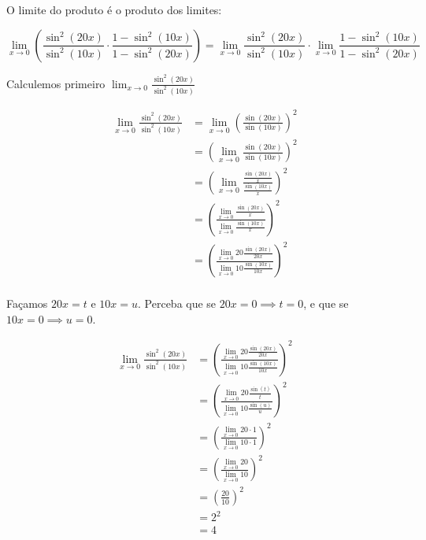 \documentclass{article}
\begin{document}
O limite do produto é o produto dos limites:

\begin{equation} \label{question_3_product_limit}
    \lim_{x \to 0} \left(\frac{ \sin^2 (20x)}{\sin^2 (10x)} \cdot \frac{1 - \sin^2 (10x)}{1 - \sin^2 (20x)}\right)
    = \lim_{x \to 0} \frac{ \sin^2 (20x)}{\sin^2 (10x)}  \cdot \lim_{x \to 0}  \frac{1 - \sin^2 (10x)}{1 - \sin^2 (20x)}
\end{equation}

Calculemos primeiro \(\lim_{x \to 0} \frac{ \sin^2 (20x)}{\sin^2 (10x)}\)

\begin{align*}
    \lim_{x \to 0} \frac{ \sin^2 (20x)}{\sin^2 (10x)}
     & = \lim_{x \to 0} \left( \frac{ \sin (20x)}{\sin (10x)} \right)^2                                            \\
     & =  \left( \lim_{x \to 0} \frac{ \sin (20x)}{\sin (10x)} \right)^2                                           \\
     & = \left(\lim_{x \to 0} \frac{ \frac{\sin (20x)}{x}}{\frac{\sin (10x)}{x}}\right)^2                          \\
     & = \left( \frac{\lim_{x \to 0} \frac{\sin (20x)}{x}}{\lim_{x \to 0} \frac{\sin (10x)}{x}}\right)^2           \\
     & = \left( \frac{\lim_{x \to 0} 20 \frac{\sin (20x)}{20x}}{\lim_{x \to 0} 10 \frac{\sin (10x)}{10x}}\right)^2 \\
\end{align*}

Façamos \(20x = t\) e \(10x = u\). Perceba que se \(20x = 0 \implies t = 0 \),
e que se \(10x = 0 \implies u = 0 \).

\begin{align*}
    \lim_{x \to 0} \frac{ \sin^2 (20x)}{\sin^2 (10x)}
     & = \left( \frac{\lim_{x \to 0} 20 \frac{\sin (20x)}{20x}}{\lim_{x \to 0} 10 \frac{\sin (10x)}{10x}}\right)^2 \\
     & = \left( \frac{\lim_{x \to 0} 20 \frac{\sin (t)}{t}}{\lim_{x \to 0} 10 \frac{\sin (u)}{u}}\right)^2         \\
     & = \left( \frac{\lim_{x \to 0} 20 \cdot 1}{\lim_{x \to 0} 10 \cdot 1}\right)^2                               \\
     & = \left( \frac{\lim_{x \to 0} 20 }{\lim_{x \to 0} 10 }\right)^2                                             \\
     & = \left( \frac{ 20 }{ 10 }\right)^2                                                                         \\
     & =  2^2                                                                                                      \\
     & =  4                                                                                                        \\
\end{align*}
\end{document}
